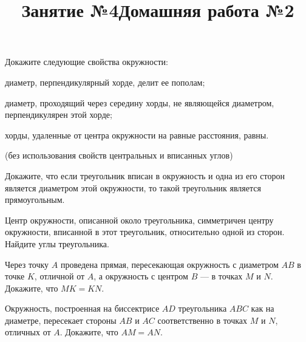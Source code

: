 \begin{listofex}
	\item Докажите следующие свойства окружности:
	\begin{enumcols}[itemcolumns=1]
		\item диаметр, перпендикулярный хорде, делит ее пополам;
		\item диаметр, проходящий через середину хорды, не являющейся диаметром, перпендикулярен этой хорде;
		\item хорды, удаленные от центра окружности на равные расстояния, равны.
	\end{enumcols}
	\item {}
	\item {}(без использования свойств центральных и вписанных углов)
	\item {}
	\item {}
	\item {}
	\item Докажите, что если треугольник вписан в окружность и одна из его сторон является диаметром этой окружности, то такой треугольник является прямоугольным.
	\item Центр окружности, описанной около треугольника, симметричен центру окружности, вписанной в этот треугольник, относительно одной из сторон. Найдите углы треугольника.
	\item Через точку \( A \) проведена прямая, пересекающая
	окружность с диаметром \( AB \) в точке \( K \), отличной от \( A \), а
	окружность с центром \( B \) --- в точках \( M \) и \( N \). Докажите, что \( MK = KN \).
\end{listofex}
\newpage
\title{Занятие №4}
\begin{listofex}
	\item {}
	\item {}
	\item {}
	\item {}
	\item {}
	\item {}
	\item {}
	\item Окружность, построенная на биссектрисе \( AD \) треугольника \( ABC \) как на диаметре, пересекает стороны \( AB \) и \( AC \) соответственно в точках \( M \) и \( N \), отличных от \( A \). Докажите, что \( AM = AN \).
\end{listofex}
\newpage
\title{Домашняя работа №2}
